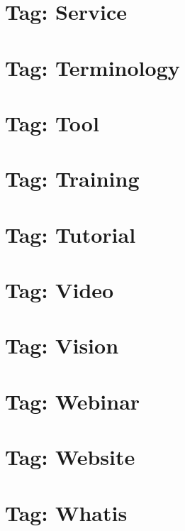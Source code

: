 \documentclass[twoside]{book}
\newcommand{\+}{\discretionary{\mbox{\scriptsize$\hookleftarrow$}}{}{}}
\begin{document}
\chapter{Tag\+: Service}
\label{md_markdown_tag_service}

\chapter{Tag\+: Terminology}
\label{md_markdown_tag_terminology}

\chapter{Tag\+: Tool}
\label{md_markdown_tag_tool}

\chapter{Tag\+: Training}
\label{md_markdown_tag_training}

\chapter{Tag\+: Tutorial}
\label{md_markdown_tag_tutorial}

\chapter{Tag\+: Video}
\label{md_markdown_tag_video}

\chapter{Tag\+: Vision}
\label{md_markdown_tag_vision}

\chapter{Tag\+: Webinar}
\label{md_markdown_tag_webinar}

\chapter{Tag\+: Website}
\label{md_markdown_tag_website}

\chapter{Tag\+: Whatis}
\label{md_markdown_tag_whatis}

\end{document}
